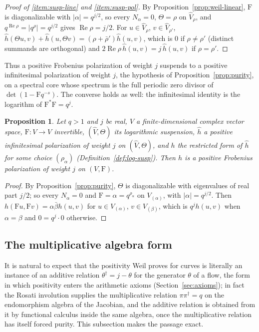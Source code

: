\documentclass[11pt]{amsart}
\theoremstyle{plain}
\newtheorem{proposition}[theorem]{Proposition}
\theoremstyle{definition}
\theoremstyle{remark}
\numberwithin{equation}{section}
\DeclareMathOperator{\Rea}{Re}
\renewcommand{\Re}{\Rea}
\begin{document}
\begin{proof}[Proof of \ref{item:susp-line} and \ref{item:susp-pol}]
By Proposition~\ref{prop:weil-linear}, $\mathrm{F}$ is diagonalizable
with $|\alpha|=q^{j/2}$, so every $N_\alpha=0$, $\Theta=\rho$ on
$\widehat V_\rho$, and $q^{\Re\rho}=|q^\rho|=q^{j/2}$ gives
$\Re\rho=j/2$. For $u\in\widehat V_\rho$, $v\in\widehat V_{\rho'}$,
$\widehat h(\Theta u,v)+\widehat h(u,\Theta v)=(\rho+\bar\rho')
\widehat h(u,v)$, which is $0$ if $\rho\ne\rho'$ (distinct summands are
orthogonal) and $2\Re\rho\,\widehat h(u,v)=j\,\widehat h(u,v)$ if
$\rho=\rho'$.
\end{proof}

Thus a positive Frobenius polarization of weight $j$ suspends to a
positive infinitesimal polarization of weight $j$, the hypothesis of
Proposition~\ref{prop:purity}, on a spectral core whose spectrum is the
full periodic zero divisor of $\det(1-\mathrm{F}q^{-s})$. The converse
holds as well: the infinitesimal identity is the logarithm of
$\mathrm{F}^*\mathrm{F}=q^j$.

\begin{proposition}\label{prop:susp-converse}
Let $q>1$ and $j$ be real, $V$ a finite-dimensional complex vector
space, $\mathrm{F}:V\to V$ invertible, $(\widehat V,\Theta)$ its
logarithmic suspension, $\widehat h$ a positive infinitesimal
polarization of weight $j$ on $(\widehat V,\Theta)$, and $h$ the
restricted form of $\widehat h$ for some choice $(\rho_\alpha)$
(Definition~\ref{def:log-susp}). Then $h$ is a positive Frobenius
polarization of weight $j$ on $(V,\mathrm{F})$.
\end{proposition}

\begin{proof}
By Proposition~\ref{prop:purity}, $\Theta$ is diagonalizable with
eigenvalues of real part $j/2$; so every $N_\alpha=0$ and
$\mathrm{F}=\alpha=q^{\rho_\alpha}$ on $V_{(\alpha)}$, with
$|\alpha|=q^{j/2}$. Then $h(\mathrm{F}u,\mathrm{F}v)=\alpha\bar\beta
h(u,v)$ for $u\in V_{(\alpha)}$, $v\in V_{(\beta)}$, which is
$q^jh(u,v)$ when $\alpha=\beta$ and $0=q^j\cdot0$ otherwise.
\end{proof}

\subsection{The multiplicative algebra form}\label{subsec:mult-form}

It is natural to expect that the positivity Weil proves for curves is
literally an instance of an additive relation $\theta^\dagger=j-\theta$
for the generator $\theta$ of a flow, the form in which positivity
enters the arithmetic axioms (Section~\ref{sec:axioms}); in fact the
Rosati involution supplies the multiplicative relation
$\pi\pi^\dagger=q$ on the endomorphism algebra of the Jacobian, and the
additive relation is obtained from it by functional calculus inside the
same algebra, once the multiplicative relation has itself forced
purity. This subsection makes the passage exact.
\end{document}
